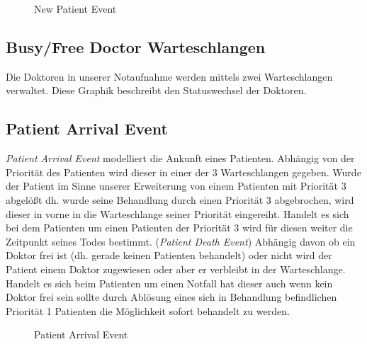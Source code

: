 \documentclass[12pt,fleqn,a4paper]{article}
\begin{document}
\begin{figure}[h]
	\centering
  	\caption{New Patient Event}
\end{figure}

\subsection{Busy/Free Doctor Warteschlangen}
Die Doktoren in unserer Notaufnahme werden mittels zwei Warteschlangen verwaltet. Diese Graphik beschreibt den Statuswechsel der Doktoren.
\begin{center}
\end{center}

\newpage
\subsection{Patient Arrival Event}
\textit{Patient Arrival Event} modelliert die Ankunft eines Patienten.
Abh\"{a}ngig von der Priorit\"{a}t des Patienten wird dieser in einer der 3 Warteschlangen gegeben. Wurde der Patient im Sinne unserer Erweiterung von einem Patienten mit Priorit\"{a}t 3 abgel\"{o}\ss t dh. wurde seine Behandlung durch einen Priorit\"{a}t 3 abgebrochen, wird dieser in vorne in die Warteschlange seiner Priorit\"{a}t eingereiht. Handelt es sich bei dem Patienten um einen Patienten der Priorit\"{a}t 3 wird f\"{u}r diesen weiter die Zeitpunkt seines Todes bestimmt. (\textit{Patient Death Event})
Abh\"{a}ngig davon ob ein Doktor frei ist (dh. gerade keinen Patienten behandelt) oder nicht wird der Patient einem Doktor zugewiesen oder aber er verbleibt in der Warteschlange.
Handelt es sich beim Patienten um einen Notfall hat dieser auch wenn kein Doktor frei sein sollte durch Abl\"{o}sung eines sich in Behandlung befindlichen Priorit\"{a}t 1 Patienten die M\"{o}glichkeit sofort behandelt zu werden.


\begin{figure}[h]
	\centering
	\caption{Patient Arrival Event}
\end{figure}


\newpage
\end{document}
